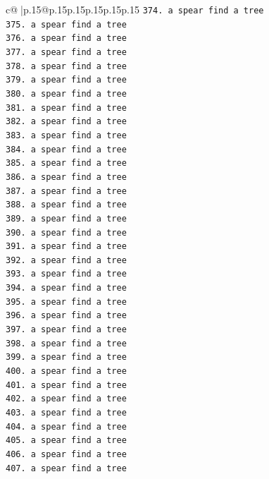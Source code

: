 \documentclass{article}
\begin{document}
{\begin{supertabular}{c@{$\;$}|p{.15\linewidth}@{}p{.15\linewidth}p{.15\linewidth}p{.15\linewidth}p{.15\linewidth}p{.15\linewidth}}
{{{\texttt{374. a spear find a tree} \\
\texttt{375. a spear find a tree} \\
\texttt{376. a spear find a tree} \\
\texttt{377. a spear find a tree} \\
\texttt{378. a spear find a tree} \\
\texttt{379. a spear find a tree} \\
\texttt{380. a spear find a tree} \\
\texttt{381. a spear find a tree} \\
\texttt{382. a spear find a tree} \\
\texttt{383. a spear find a tree} \\
\texttt{384. a spear find a tree} \\
\texttt{385. a spear find a tree} \\
\texttt{386. a spear find a tree} \\
\texttt{387. a spear find a tree} \\
\texttt{388. a spear find a tree} \\
\texttt{389. a spear find a tree} \\
\texttt{390. a spear find a tree} \\
\texttt{391. a spear find a tree} \\
\texttt{392. a spear find a tree} \\
\texttt{393. a spear find a tree} \\
\texttt{394. a spear find a tree} \\
\texttt{395. a spear find a tree} \\
\texttt{396. a spear find a tree} \\
\texttt{397. a spear find a tree} \\
\texttt{398. a spear find a tree} \\
\texttt{399. a spear find a tree} \\
\texttt{400. a spear find a tree} \\
\texttt{401. a spear find a tree} \\
\texttt{402. a spear find a tree} \\
\texttt{403. a spear find a tree} \\
\texttt{404. a spear find a tree} \\
\texttt{405. a spear find a tree} \\
\texttt{406. a spear find a tree} \\
\texttt{407. a spear find a tree} \\
}}}
\end{supertabular}}
\end{document}
